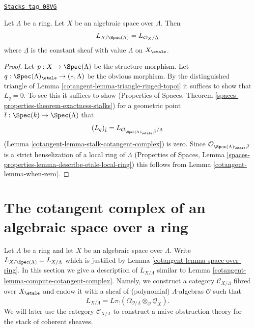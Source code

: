 \begin{lemma}
\label{cotangent-lemma-space-over-ring}
\href{https://stacks.math.columbia.edu/tag/08VG}{\texttt{Stacks tag 08VG}}

Let $\Lambda$ be a ring. Let $X$ be an algebraic space over $\Lambda$.
Then
$$
L_{X/\Spec(\Lambda)} = L_{\mathcal{O}_X/\underline{\Lambda}}
$$
where $\underline{\Lambda}$ is the constant sheaf with value
$\Lambda$ on $X_\etale$.
\end{lemma}

\begin{proof}

Let $p : X \to \Spec(\Lambda)$ be the structure morphism.
Let $q : \Spec(\Lambda)_\etale \to (*, \Lambda)$
be the obvious morphism. By the distinguished triangle of
Lemma \ref{cotangent-lemma-triangle-ringed-topoi}
it suffices to show that $L_q = 0$. To see this it suffices to
show
(Properties of Spaces, Theorem
\ref{spaces-properties-theorem-exactness-stalks})
for a geometric point $\overline{t} : \Spec(k) \to \Spec(\Lambda)$ that
$$
(L_q)_{\overline{t}} =
L_{\mathcal{O}_{\Spec(\Lambda)_\etale, \overline{t}}/\Lambda}
$$
(Lemma \ref{cotangent-lemma-stalk-cotangent-complex})
is zero. Since $\mathcal{O}_{\Spec(\Lambda)_\etale, \overline{t}}$
is a strict henselization of a local ring of $\Lambda$
(Properties of Spaces, Lemma
\ref{spaces-properties-lemma-describe-etale-local-ring})
this follows from Lemma \ref{cotangent-lemma-when-zero}.
\end{proof}

\section{The cotangent complex of an algebraic space over a ring}
\label{cotangent-section-cotangent-spaces-variant}
Let $\Lambda$ be a ring and let $X$ be an algebraic space over $\Lambda$.
Write $L_{X/\Spec(\Lambda)} = L_{X/\Lambda}$ which is justified
by Lemma \ref{cotangent-lemma-space-over-ring}.
In this section we give a description of $L_{X/\Lambda}$ similar to
Lemma \ref{cotangent-lemma-compute-cotangent-complex}.
Namely, we construct a category $\mathcal{C}_{X/\Lambda}$
fibred over $X_\etale$ and endow it with a sheaf of (polynomial)
$\Lambda$-algebras $\mathcal{O}$ such that
$$
L_{X/\Lambda} =
L\pi_!(\Omega_{\mathcal{O}/\underline{\Lambda}} \otimes_\mathcal{O}
\underline{\mathcal{O}}_X).
$$
We will later use the category $\mathcal{C}_{X/\Lambda}$ to construct
a naive obstruction theory for the stack of coherent sheaves.

